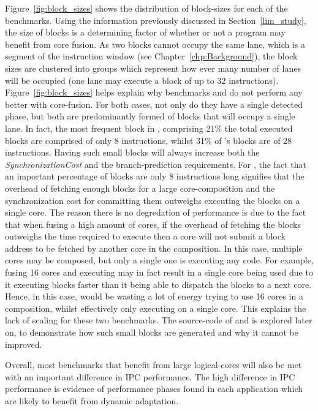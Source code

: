 Figure~\ref{fig:block_sizes} shows the distribution of block-sizes for each of the benchmarks.
Using the information previously discussed in Section~\ref{lim_study}, the size of blocks is a determining factor of whether or not a program may benefit from core fusion.
As two blocks cannot occupy the same lane, which is a segment of the instruction window (see Chapter~\ref{chp:Background}), the block sizes are clustered into groups which represent how ever many number of lanes will be occupied (one lane may execute a block of up to 32 instructions).
Figure~\ref{fig:block_sizes} helps explain why benchmarks  and  do not perform any better with core-fusion.
For both cases, not only do they have a single detected phase, but both are predominantly formed of blocks that will occupy a single lane.
In fact, the most frequent block in , comprising 21\% the total executed blocks are comprised of only 8 instructions, whilst 31\% of 's blocks are of 28 instructions.
Having such small blocks will always increase both the \textit{SynchronizationCost} and the branch-prediction requirements.
For , the fact that an important percentage of blocks are only 8 instructions long signifies that the overhead of fetching enough blocks for a large core-composition and the synchronization cost for committing them outweighs executing the blocks on a single core.
The reason there is no degredation of performance is due to the fact that when fusing a high amount of cores, if the overhead of fetching the blocks outweighs the time required to execute then a core will not submit a block address to be fetched by another core in the composition.
In this case, multiple cores may be composed, but only a single one is executing any code.
For example, fusing 16 cores and executing  may in fact result in a single core being used due to it executing blocks faster than it being able to dispatch the blocks to a next core.
Hence, in this case,  would be wasting a lot of energy trying to use 16 cores in a composition, whilst effectively only executing on a single core. 
This explains the lack of scaling for these two benchmarks.
The source-code of  and  is explored later on, to demonstrate how such small blocks are generated and why it cannot be improved.

Overall, most benchmarks that benefit from large logical-cores will also be met with an important difference in IPC performance.
The high difference in IPC performance is evidence of performance phases found in each application which are likely to benefit from dynamic adaptation.

